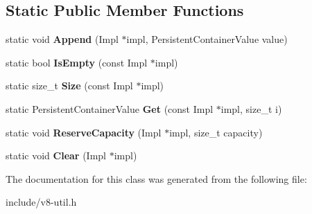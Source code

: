 \subsection*{Static Public Member Functions}
\begin{DoxyCompactItemize}
\item 
static void {\bfseries Append} (Impl $\ast$impl, Persistent\+Container\+Value value)\hypertarget{classv8_1_1_default_persistent_value_vector_traits_ac3088f4b37e68ca9ed668a859f89cf21}{}\label{classv8_1_1_default_persistent_value_vector_traits_ac3088f4b37e68ca9ed668a859f89cf21}

\item 
static bool {\bfseries Is\+Empty} (const Impl $\ast$impl)\hypertarget{classv8_1_1_default_persistent_value_vector_traits_a5b410d98817c143d2a3bf0e9dac34bd0}{}\label{classv8_1_1_default_persistent_value_vector_traits_a5b410d98817c143d2a3bf0e9dac34bd0}

\item 
static size\+\_\+t {\bfseries Size} (const Impl $\ast$impl)\hypertarget{classv8_1_1_default_persistent_value_vector_traits_a49748bb910ea3482c078c1a8e566bd44}{}\label{classv8_1_1_default_persistent_value_vector_traits_a49748bb910ea3482c078c1a8e566bd44}

\item 
static Persistent\+Container\+Value {\bfseries Get} (const Impl $\ast$impl, size\+\_\+t i)\hypertarget{classv8_1_1_default_persistent_value_vector_traits_ab9787aa7b041a30714cd17258c886cd7}{}\label{classv8_1_1_default_persistent_value_vector_traits_ab9787aa7b041a30714cd17258c886cd7}

\item 
static void {\bfseries Reserve\+Capacity} (Impl $\ast$impl, size\+\_\+t capacity)\hypertarget{classv8_1_1_default_persistent_value_vector_traits_afda15875d9691152b30549e4dbe4eb95}{}\label{classv8_1_1_default_persistent_value_vector_traits_afda15875d9691152b30549e4dbe4eb95}

\item 
static void {\bfseries Clear} (Impl $\ast$impl)\hypertarget{classv8_1_1_default_persistent_value_vector_traits_ab15a15e95f274defd3362536ae502361}{}\label{classv8_1_1_default_persistent_value_vector_traits_ab15a15e95f274defd3362536ae502361}

\end{DoxyCompactItemize}


The documentation for this class was generated from the following file\+:\begin{DoxyCompactItemize}
\item 
include/v8-\/util.\+h\end{DoxyCompactItemize}
